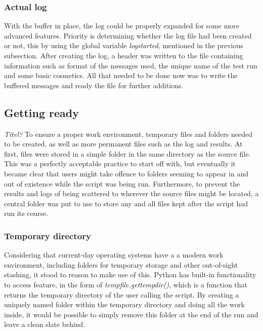 \documentclass[11pt,british]{article}
\begin{document}
\subsubsection{Actual log}
With the buffer in place, the log could be properly expanded for some more advanced features. Priority is determining whether the log file had been created or not, this by using the global variable \emph{logstarted}, mentioned in the previous subsection. After creating the log, a header was written to the file containing information such as format of the messages used, the unique name of the test run and some basic cosmetics. All that needed to be done now was to write the buffered messages and ready the file for further additions.

\subsection{Getting ready}
\emph{\color{red} Titel?}
To ensure a proper work environment, temporary files and folders needed to be created, as well as more permanent files such as the log and results. At first, files were stored in a simple folder in the same directory as the source file. This was a perfectly acceptable practice to start off with, but eventually it became clear that users might take offence to folders seeming to appear in and out of existence while the script was being run. Furthermore, to prevent the results and logs of being scattered to wherever the source files might be located, a central folder was put to use to store any and all files kept after the script had run its course.

\subsubsection{Temporary directory}
Considering that current-day operating systems have a a modern work environment, including folders for temporary storage and other out-of-sight stashing, it stood to reason to make use of this. Python has built-in functionality to access feature, in the form of \emph{tempfile.gettempdir()}, which is a function that returns the temporary directory of the user calling the script. By creating a uniquely named folder within the temporary directory and doing all the work inside, it would be possible to simply remove this folder at the end of the run and leave a clean slate behind.
\end{document}
